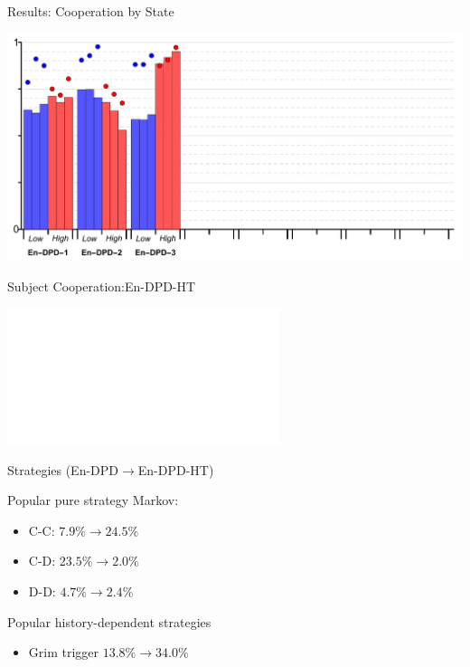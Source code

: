 \documentclass{beamer}
\begin{document}
\begin{frame}{Results: Cooperation by State}
\begin{card}
    \begin{center}
    	\includegraphics[width=1.0\textwidth]{./i/col_bar_StateCoop_block_EnDPD_H.pdf}
    \end{center}
\end{card}
\end{frame}

\begin{frame}{Subject Cooperation:En-DPD-HT }
\begin{card}
    \begin{center}
    	\includegraphics<2>[width=0.6\textwidth]{./i/col_subject_stateCooperation_L5_EnDPD_H.pdf}
    \end{center}
\end{card}
\end{frame}


\begin{frame}{Strategies (En-DPD$\rightarrow$En-DPD-HT)}

    \begin{card}
     Popular pure strategy Markov:
    \begin{itemize}
    \item C-C: $7.9\%\rightarrow24.5\%$
    \item C-D: $23.5\%\rightarrow2.0\%$
    \item D-D: $4.7\%\rightarrow2.4\%$
    \end{itemize}
    \end{card}
    \begin{card}
    Popular history-dependent strategies
    
    \begin{itemize}
    \item Grim trigger $13.8\%\rightarrow34.0\%$
    \end{itemize}
    \end{card}
\end{frame}
\end{document}

